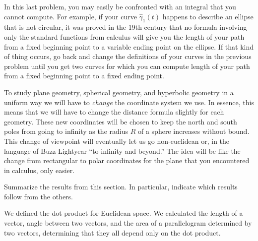 \documentclass[newpage,hints,handout,nooutcomes,noauthor,12pt]{ximera}
\begin{document}
\begin{remark}
  In this last problem, you may easily be confronted with an integral that you
  cannot compute. For example, if your curve $\hat{\gamma}_{1}(t)$ happens to
  describe an ellipse that is not circular, it was proved in the 19th century
  that no formula involving only the standard functions from calculus will give
  you the length of your path from a fixed beginning point to a variable ending
  point on the ellipse. If that kind of thing occurs, go back and change the
  definitions of your curves in the previous problem until you get two
  curves for which you can compute length of your path from a fixed
  beginning point to a fixed ending point. %
\end{remark}





To study plane geometry, spherical geometry, and hyperbolic geometry in a
uniform way we will have to \textit{change} the coordinate system we use. In
essence, this means that we will have to change the distance formula slightly
for each geometry. These new coordinates will be chosen to keep the north and
south poles from going to infinity as the radius $R$ of a sphere increases
without bound. This change of viewpoint will eventually let us go non-euclidean
or, in the language of Buzz Lightyear ``to infinity and beyond.'' The idea will
be like the change from rectangular to polar coordinates for the plane that you
encountered in calculus, only easier.


\begin{problem}
Summarize the results from this section. In particular, indicate which
results follow from the others.
\begin{freeResponse}
We defined the dot product for Euclidean space. We calculated the length of a vector, angle between two vectors, and the area of a parallelogram determined by two vectors, determining that they all depend only on the dot product. 
\end{freeResponse}
\end{problem}
\end{document}
